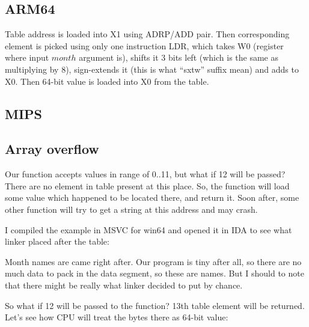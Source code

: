 \subsection{ARM64}



Table address is loaded into X1 using ADRP/ADD pair.
Then corresponding element is picked using only one instruction LDR, which takes W0 
(register where input $month$ argument is), shifts it 3 bits left (which is the same as multiplying by 8), 
sign-extends it (this is what ``sxtw'' suffix mean) and adds to X0.
Then 64-bit value is loaded into X0 from the table.
\fi

\ifdefined\IncludeMIPS
\subsection{MIPS}


\fi

\subsection{Array overflow}

Our function accepts values in range of 0..11, but what if 12 will be passed?
There are no element in table present at this place.
So, the function will load some value which happened to be located there, and return it.
Soon after, some other function will try to get a string at this address and may crash.

I compiled the example in MSVC for win64 and opened it in IDA to see what linker placed after the table:



Month names are came right after.
Our program is tiny after all, so there are no much data to pack in the data segment, so these are names.
But I should to note that there might be really  what linker decided to put by chance.

So what if 12 will be passed to the function?
13th table element will be returned.
Let's see how CPU will treat the bytes there as 64-bit value:



